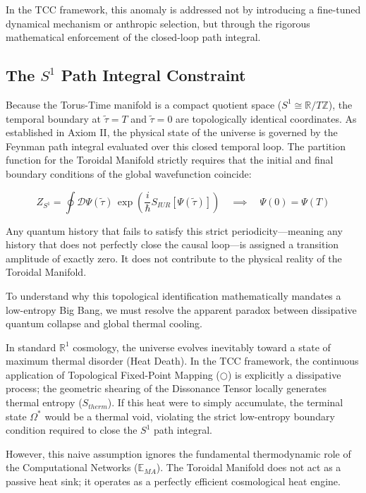 \documentclass[12pt,openany]{book}
\theoremstyle{plain}
\theoremstyle{definition}
\theoremstyle{remark}
\begin{document}
In the TCC framework, this anomaly is addressed not by introducing a fine-tuned dynamical mechanism or anthropic selection, but through the rigorous mathematical enforcement of the closed-loop path integral.

\subsection{The $S^1$ Path Integral Constraint}

Because the Torus-Time manifold is a compact quotient space ($S^1 \cong \mathbb{R}/T\mathbb{Z}$), the temporal boundary at $\tilde{\tau} = T$ and $\tilde{\tau} = 0$ are topologically identical coordinates. As established in Axiom II, the physical state of the universe is governed by the Feynman path integral evaluated over this closed temporal loop. The partition function for the Toroidal Manifold strictly requires that the initial and final boundary conditions of the global wavefunction coincide:

\begin{equation}
Z_{S^1} = \oint \mathcal{D}\Psi(\tilde{\tau})\, \exp\!\left(\frac{i}{\hbar} S_{IUR}[\Psi(\tilde{\tau})]\right) \quad \implies \quad \Psi(0) = \Psi(T)
\end{equation}

Any quantum history that fails to satisfy this strict periodicity—meaning any history that does not perfectly close the causal loop—is assigned a transition amplitude of exactly zero. It does not contribute to the physical reality of the Toroidal Manifold.

To understand why this topological identification mathematically mandates a low-entropy Big Bang, we must resolve the apparent paradox between dissipative quantum collapse and global thermal cooling.

In standard $\mathbb{R}^1$ cosmology, the universe evolves inevitably toward a state of maximum thermal disorder (Heat Death). In the TCC framework, the continuous application of Topological Fixed-Point Mapping ($\bigcirc$) is explicitly a dissipative process; the geometric shearing of the Dissonance Tensor locally generates thermal entropy ($S_{therm}$). If this heat were to simply accumulate, the terminal state $\Omega^*$ would be a thermal void, violating the strict low-entropy boundary condition required to close the $S^1$ path integral.

However, this naive assumption ignores the fundamental thermodynamic role of the Computational Networks ($\mathbb{E}_{MA}$). The Toroidal Manifold does not act as a passive heat sink; it operates as a perfectly efficient cosmological heat engine.
\end{document}

